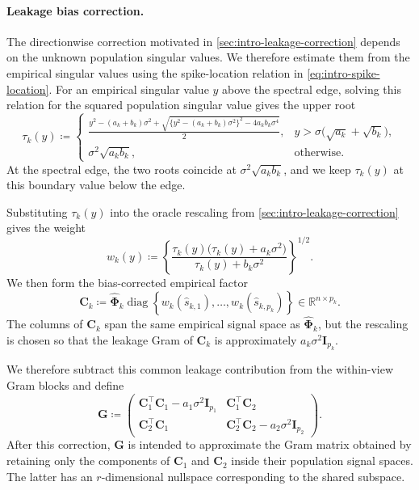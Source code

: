 \documentclass[11pt]{article}
\newcommand{\trans}{\top}
\DeclareMathOperator{\diag}{diag}
\begin{document}
\paragraph{Leakage bias correction.}
The directionwise correction motivated in
\cref{sec:intro-leakage-correction} depends on the unknown population
singular values. We therefore estimate them from the empirical singular
values using the spike-location relation in
\cref{eq:intro-spike-location}. For an empirical singular value $y$ above
the spectral edge, solving this relation for the squared population
singular value gives the upper root
\begin{equation}
\label{eq:tau}
  \tau_k(y)
  \coloneqq
  \begin{cases}
    \displaystyle
    \frac{
      y^2-(a_k+b_k)\sigma^2
      +
      \sqrt{
        \bigl\{y^2-(a_k+b_k)\sigma^2\bigr\}^2
        -4a_kb_k\sigma^4
      }
    }{2},
    &
    y>
    \sigma\bigl(\sqrt{a_k}+\sqrt{b_k}\bigr),
    \\[12pt]
    \sigma^2\sqrt{a_kb_k},
    &
    \text{otherwise}.
  \end{cases}
\end{equation}
At the spectral edge, the two roots coincide at
$\sigma^2\sqrt{a_kb_k}$, and we keep $\tau_k(y)$ at this boundary value
below the edge.

Substituting $\tau_k(y)$ into the oracle rescaling from
\cref{sec:intro-leakage-correction} gives the weight
\begin{equation}
\label{eq:omega}
  w_k(y)
  \coloneqq
  \left\{
    \frac{
      \tau_k(y)\bigl(\tau_k(y)+a_k\sigma^2\bigr)
    }{
      \tau_k(y)+b_k\sigma^2
    }
  \right\}^{1/2}.
\end{equation}
We then form the bias-corrected empirical factor
\begin{equation}
\label{eq:C}
  \bm C_k
  \coloneqq
  \widehat{\bm\Phi}_k
  \diag\!\left\{
    w_k(\widehat s_{k,1}),
    \ldots,
    w_k(\widehat s_{k,p_k})
  \right\}
  \in\mathbb R^{n\times p_k}.
\end{equation}
The columns of $\bm C_k$ span the same empirical signal space as
$\widehat{\bm\Phi}_k$, but the rescaling is chosen so that the leakage Gram
of $\bm C_k$ is approximately $a_k\sigma^2\bm I_{p_k}$.



We therefore subtract this common leakage contribution from the within-view
Gram blocks and define
\begin{equation}
\label{eq:G}
  \bm G
  \coloneqq
  \begin{pmatrix}
    \bm C_1^\trans\bm C_1-a_1\sigma^2\bm I_{p_1}
    &
    \bm C_1^\trans\bm C_2
    \\
    \bm C_2^\trans\bm C_1
    &
    \bm C_2^\trans\bm C_2-a_2\sigma^2\bm I_{p_2}
  \end{pmatrix}.
\end{equation}
After this correction, $\bm G$ is intended to approximate the Gram matrix
obtained by retaining only the components of $\bm C_1$ and $\bm C_2$
inside their population signal spaces. The latter has an $r$-dimensional
nullspace corresponding to the shared subspace.
\end{document}
